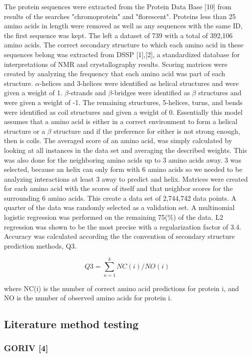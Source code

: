 \documentclass{article}
\begin{document}
The protein sequences were extracted from the Protein Data Base [10] from results of the searches "chromoprotein" and "florescent". Proteins less than 25 amino acids in length were removed as well as any sequences with the same ID, the first sequence was kept. The left a dataset of 739 with a total of 392,106 amino acids. The correct secondary structure to which each amino acid in these sequences belong was extracted from DSSP [1],[2], a standardized database for interpretations of NMR and crystallography results. Scoring matrices were created by analyzing the frequency that each amino acid was part of each structure. $\alpha$-helices and 3-helices were identified as helical structures and were given a weight of 1. $\beta$-strands and $\beta$-bridges were identified as $\beta$ structures and were given a weight of -1. The remaining structures, 5-helices, turns, and bends were identified as coil structures and given a weight of 0. Essentially this model assumes that a amino acid is either in a correct environment to form a helical structure or a $\beta$ structure and if the preference for either is not strong enough, then is coils. The averaged score of an amino acid, was simply calculated by looking at all instances in the data set and averaging the described weights. This was also done for the neighboring amino acids up to 3 amino acids away. 3 was selected, because an helix can only form with 6 amino acids so we needed to be analyzing interactions at least 3 away to predict and helix. Matrices were created for each amino acid with the scores of itself and that neighbor scores for the surrounding 6 amino acids. This create a data set of 2,744,742 data points. A quarter of the data was randomly selected as a validation set. A multinomial logistic regression was performed on the remaining 75(\%) of the data. L2 regression was shown to be the most precise with a regularization factor of 3.4. Accuracy was calculated according the the convention of secondary structure prediction methods, Q3.

$$Q3=\sum_{n=1}^{k} NC(i)/NO(i) $$

where NC(i) is the number of correct amino acid predictions for protein i, and NO is the number of observed amino acids for protein i.

\subsection{Literature method testing}

\subsubsection{GORIV [4]}
\end{document}
